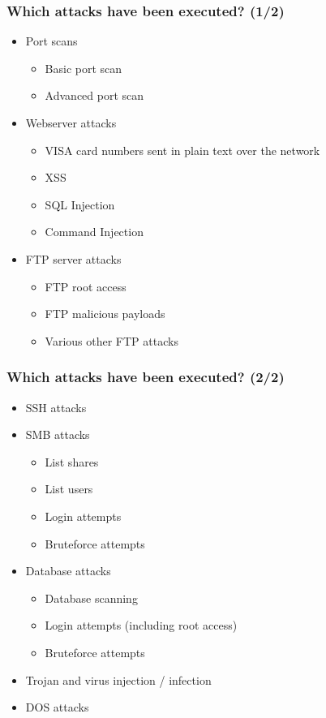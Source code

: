 \documentclass{beamer}
\begin{document}
\begin{frame}
\frametitle{Which attacks have been executed? (1/2)}
\begin{itemize}
\item Port scans
	\begin{itemize}
	\item Basic port scan
	\item Advanced port scan
	\end{itemize}
\item Webserver attacks
	\begin{itemize}
	\item VISA card numbers sent in plain text over the network
	\item XSS
	\item SQL Injection
	\item Command Injection
	\end{itemize}
\item FTP server attacks
	\begin{itemize}
	\item FTP root access
	\item FTP malicious payloads
	\item Various other FTP attacks
	\end{itemize}
\end{itemize}
\end{frame}

\begin{frame}
\frametitle{Which attacks have been executed? (2/2)}
\begin{itemize}
\item SSH attacks
\item SMB attacks
	\begin{itemize}
	\item List shares
	\item List users
	\item Login attempts
	\item Bruteforce attempts
	\end{itemize}
\item Database attacks
	\begin{itemize}
	\item Database scanning
	\item Login attempts (including root access)
	\item Bruteforce attempts
	\end{itemize}
\item Trojan and virus injection / infection
\item DOS attacks
\end{itemize}
\end{frame}
\end{document}
